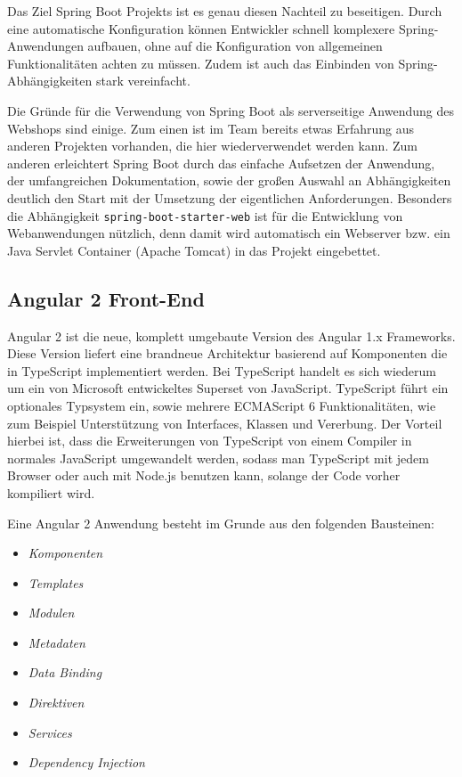 Das Ziel Spring Boot Projekts ist es genau diesen Nachteil zu beseitigen. Durch eine automatische Konfiguration können Entwickler schnell komplexere Spring-Anwendungen aufbauen, ohne auf die Konfiguration von allgemeinen Funktionalitäten achten zu müssen. Zudem ist auch das Einbinden von Spring-Abhängigkeiten stark vereinfacht\cite{Webb2013}.

Die Gründe für die Verwendung von Spring Boot als serverseitige Anwendung des Webshops sind einige. Zum einen ist im Team bereits etwas Erfahrung aus anderen Projekten vorhanden, die hier wiederverwendet werden kann. Zum anderen erleichtert Spring Boot durch das einfache Aufsetzen der Anwendung, der umfangreichen Dokumentation, sowie der großen Auswahl an Abhängigkeiten deutlich den Start mit der Umsetzung der eigentlichen Anforderungen. Besonders die Abhängigkeit \texttt{spring-boot-starter-web} ist für die Entwicklung von Webanwendungen nützlich, denn damit wird automatisch ein Webserver bzw. ein Java Servlet Container (Apache Tomcat) in das Projekt eingebettet.

\subsection{Angular 2 Front-End}

Angular 2 ist die neue, komplett umgebaute Version des Angular 1.x Frameworks. Diese Version liefert eine brandneue Architektur basierend auf Komponenten die in TypeScript implementiert werden. Bei TypeScript handelt es sich wiederum um ein von Microsoft entwickeltes Superset von JavaScript. TypeScript führt ein optionales Typsystem ein, sowie mehrere ECMAScript 6 Funktionalitäten, wie zum Beispiel Unterstützung von Interfaces, Klassen und Vererbung. Der Vorteil hierbei ist, dass die Erweiterungen von TypeScript von einem Compiler in normales JavaScript umgewandelt werden, sodass man TypeScript mit jedem Browser oder auch mit Node.js benutzen kann, solange der Code vorher kompiliert wird\cite{Deeleman2016}. 


Eine Angular 2 Anwendung besteht im Grunde aus den folgenden Bausteinen\cite{Angular.io2017}:
\begin{itemize}
	\item \textit{Komponenten}
	\item \textit{Templates} 
	\item \textit{Modulen}
	\item \textit{Metadaten}
	\item \textit{Data Binding} 
	\item \textit{Direktiven}
	\item \textit{Services}
	\item \textit{Dependency Injection}
\end{itemize}

